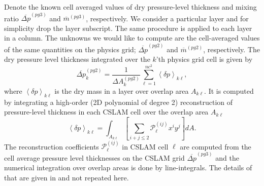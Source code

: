 \documentclass{agujournal}
\begin{document}
Denote the known cell averaged values of dry pressure-level thickness and mixing ratio $\overline{\Delta p}^{(pg3)}$ and $\overline{m}^{(pg3)}$, respectively. We consider a particular layer and for simplicity drop the layer subscript. The same procedure is applied to each layer in a column. The unknowns we would like to compute are the cell-averaged values of the same quantities on the physics grid; $\overline{\Delta p}^{(pg2)}$ and $\overline{m}^{(pg2)}$, respectively. The dry pressure level thickness integrated over the $k$'th physics grid cell is given by
\begin{equation}
\label{eq:p}
\overline{\Delta p}^{(pg2)}_k=\frac{1}{\Delta A^{(pg2)}_k}\sum_{\ell=1}^{nc^2}\left<\delta p\right>_{k\ell},
\end{equation}
where $\left< \delta p\right>_{k\ell}$ is the dry mass in a layer over overlap area $A_{k\ell}$. It is computed by integrating a high-order (2D polynomial of degree 2) reconstruction of pressure-level thickness in each CSLAM cell over the overlap area $A_{k\ell}$
\begin{equation}
\label{eq:pg3dp}
\left< \delta p\right>_{k\ell}=\int_{A_{k\ell}}\left[ \sum_{i+j\le 2}{\mathcal{P}}^{(ij)}_\ell x^{i}y^{j}\right] dA.
\end{equation}
The reconstruction coefficients ${\mathcal{P}}^{(ij)}_\ell$ in CSLAM cell $\ell$ are computed from the cell average pressure level thicknesses on the CSLAM grid $\overline{\Delta p}^{(pg3)}$ and the numerical integration over overlap areas is done by line-integrals. The details of that are given in \cite{LNU2010JCP} and not repeated here.
\end{document}

